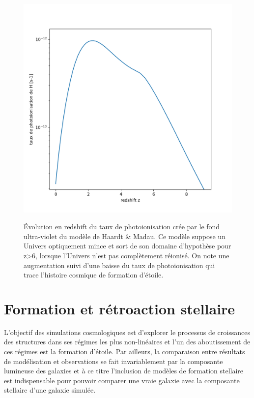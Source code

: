 \begin{figure}[htbp]
	\centering
		\includegraphics[height=12cm]{figs/HM.png}
	\caption[modèle de Haardt \& Madau]{Évolution en redshift du taux de photoionisation crée par le fond ultra-violet du modèle de Haardt \& Madau. Ce modèle suppose un Univers optiquement mince et sort de son domaine d'hypothèse pour z>6, lorsque l'Univers n'est pas complètement réionisé. On note une augmentation suivi d'une baisse du taux de photoionisation qui trace l'histoire cosmique de formation d'étoile.}
	\label{f:HM}
\end{figure}


\section{Formation et rétroaction stellaire}
L'objectif des simulations cosmologiques est d'explorer le processus de croissances des structures dans ses régimes les plus non-linéaires et l'un des aboutissement de ces régimes est la formation d'étoile. Par ailleurs, la comparaison entre résultats de modélisation et observations se fait invariablement par la composante lumineuse des galaxies et à ce titre l'inclusion de modèles de formation stellaire est indispensable pour pouvoir comparer une vraie galaxie avec la composante stellaire d'une galaxie simulée.

